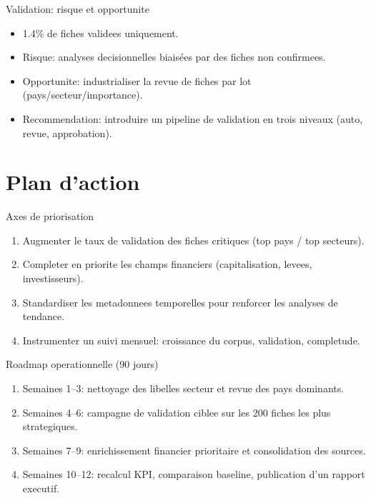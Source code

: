 \documentclass[aspectratio=169]{beamer}
\begin{document}
\begin{frame}{Validation: risque et opportunite}
\begin{itemize}
  \item 1.4\% de fiches validees uniquement.
  \item Risque: analyses decisionnelles biais\'ees par des fiches non confirmees.
  \item Opportunite: industrialiser la revue de fiches par lot (pays/secteur/importance).
  \item Recommendation: introduire un pipeline de validation en trois niveaux (auto, revue, approbation).
\end{itemize}
\end{frame}

\section{Plan d'action}

\begin{frame}{Axes de priorisation}
\begin{enumerate}
  \item Augmenter le taux de validation des fiches critiques (top pays / top secteurs).
  \item Completer en priorite les champs financiers (capitalisation, levees, investisseurs).
  \item Standardiser les metadonnees temporelles pour renforcer les analyses de tendance.
  \item Instrumenter un suivi mensuel: croissance du corpus, validation, completude.
\end{enumerate}
\end{frame}

\begin{frame}{Roadmap operationnelle (90 jours)}
\begin{enumerate}
  \item Semaines 1--3: nettoyage des libelles secteur et revue des pays dominants.
  \item Semaines 4--6: campagne de validation ciblee sur les 200 fiches les plus strategiques.
  \item Semaines 7--9: enrichissement financier prioritaire et consolidation des sources.
  \item Semaines 10--12: recalcul KPI, comparaison baseline, publication d'un rapport executif.
\end{enumerate}
\end{frame}
\end{document}

